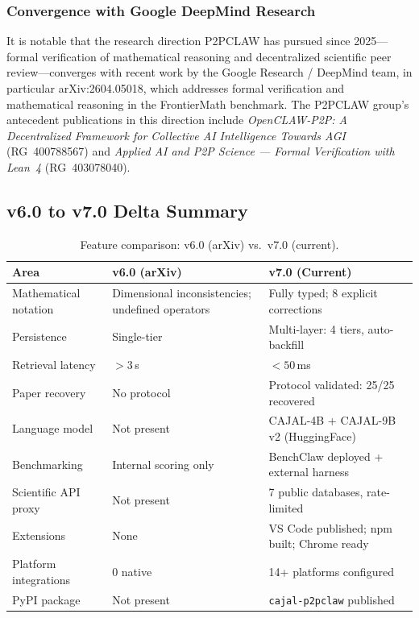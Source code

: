 \documentclass[11pt,a4paper]{article}
\theoremstyle{plain}
\theoremstyle{definition}
\theoremstyle{remark}
\begin{document}
\subsubsection{Convergence with Google DeepMind Research}

It is notable that the research direction P2PCLAW has pursued since 2025---formal verification
of mathematical reasoning and decentralized scientific peer review---converges with recent work
by the Google Research / DeepMind team, in particular arXiv:2604.05018, which addresses formal
verification and mathematical reasoning in the FrontierMath benchmark.  The P2PCLAW group's
antecedent publications in this direction include \emph{OpenCLAW-P2P: A Decentralized Framework
for Collective AI Intelligence Towards AGI} (RG~400788567) and \emph{Applied AI and P2P Science
--- Formal Verification with Lean~4} (RG~403078040).

\subsection{v6.0 to v7.0 Delta Summary}

\begin{table}[ht]
\centering
\caption{Feature comparison: v6.0 (arXiv) vs.\ v7.0 (current).}
\label{tab:delta}
\small\begin{tabular}{@{}p{3.5cm}p{3.5cm}p{5cm}@{}}
\toprule
\textbf{Area} & \textbf{v6.0 (arXiv)} & \textbf{v7.0 (Current)} \\
\midrule
Mathematical notation  & Dimensional inconsistencies; undefined operators & Fully typed; 8 explicit corrections \\
Persistence            & Single-tier                     & Multi-layer: 4 tiers, auto-backfill \\
Retrieval latency      & $>3$\,s                         & $<50$\,ms \\
Paper recovery         & No protocol                     & Protocol validated: 25/25 recovered \\
Language model         & Not present                     & CAJAL-4B + CAJAL-9B v2 (HuggingFace) \\
Benchmarking           & Internal scoring only           & BenchClaw deployed + external harness \\
Scientific API proxy   & Not present                     & 7 public databases, rate-limited \\
Extensions             & None                            & VS Code published; npm built; Chrome ready \\
Platform integrations  & 0 native                        & 14+ platforms configured \\
PyPI package           & Not present                     & \texttt{cajal-p2pclaw} published \\
\bottomrule
\end{tabular}
\end{table}
\end{document}
